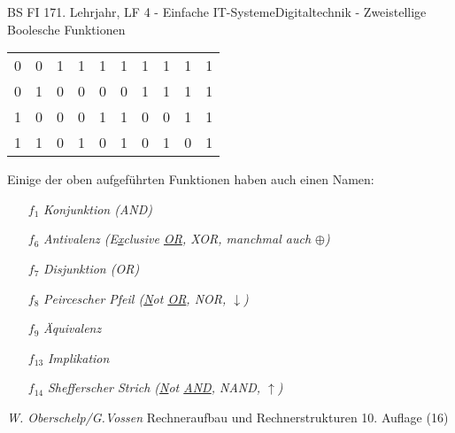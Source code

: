 \documentclass[11pt,oneside,openany,headings=optiontotoc,11pt,numbers=noenddot]{article}
\begin{document}
\begin{worksheet}{BS FI 17}{1. Lehrjahr, LF 4 - Einfache IT-Systeme}{Digitaltechnik - Zweistellige Boolesche Funktionen}
\begin{center}
\begin{tabular}{|cc|c|c|c|c|c|c|c|c|}
				\hline
				0 & 0 & 1 & 1 & 1 & 1 & 1 & 1 & 1 & 1\\
				0 & 1 & 0 & 0 & 0 & 0 & 1 & 1 & 1 & 1\\
				1 & 0 & 0 & 0 & 1 & 1 & 0 & 0 & 1 & 1\\
				1 & 1 & 0 & 1 & 0 & 1 & 0 & 1 & 0 & 1\\
				\hline
			\end{tabular}
		\end{center}
		Einige der oben aufgeführten Funktionen haben auch einen Namen:
		\begin{itemize}
			\item[\(f_1\)] \textit{Konjunktion (AND)}
			\item[\(f_6\)] \textit{Antivalenz (E\underline{x}clusive \underline{OR}, XOR, manchmal auch \(\oplus\))}
			\item[\(f_7\)] \textit{Disjunktion (OR)}
			\item[\(f_8\)] \textit{Peircescher Pfeil (\underline{N}ot \underline{OR}, NOR, \(\downarrow\))}
			\item[\(f_9\)] \textit{Äquivalenz}
			\item[\(f_{13}\)] \textit{Implikation}
			\item[\(f_{14}\)] \textit{Shefferscher Strich (\underline{N}ot \underline{AND}, NAND, \(\uparrow\))}
		\end{itemize}
		\par\bigskip\noindent
		\tiny{\color{codegray}\textit{W. Oberschelp/G.Vossen} Rechneraufbau und Rechnerstrukturen 10. Auflage (16)}
	\end{worksheet}
\end{document}
